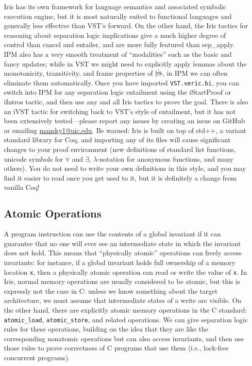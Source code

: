 \documentclass[11pt]{article}
\begin{document}
Iris has its own framework for language semantics and associated symbolic execution engine, but it is most naturally suited to functional languages and generally less effective than VST's \textsf{forward}. On the other hand, the Iris tactics for reasoning about separation logic implications give a much higher degree of control than \textsf{cancel} and \textsf{entailer}, and are more fully featured than \textsf{sep\_apply}. IPM also has a very smooth treatment of ``modalities'' such as the basic and fancy updates; while in VST we might need to explicitly apply lemmas about the monotonicity, transitivity, and frame properties of $\upd$, in IPM we can often eliminate them automatically. Once you have imported \texttt{VST.veric.bi}, you can switch into IPM for any separation logic entailment using the \textsf{iStartProof} or \textsf{iIntros} tactic, and then use any and all Iris tactics to prove the goal. There is also an \textsf{iVST} tactic for switching back to VST's style of entailment, but it has not been extensively tested---please report any issues by creating an issue on GitHub or emailing \url{mansky1@uic.edu}. Be warned: Iris is built on top of std++, a variant standard library for Coq, and importing any of its files will cause significant changes to your proof environment (new definitions of standard list functions, unicode symbols for $\forall$ and $\exists$, $\lambda$-notation for anonymous functions, and many others). You do not need to write your own definitions in this style, and you may find it easier to read once you get used to it, but it is definitely a change from vanilla Coq!

\subsection{Atomic Operations}
A program instruction can use the contents of a global invariant if it can guarantee that no one will ever see an intermediate state in which the invariant does not hold. This means that ``physically atomic'' operations can freely access invariants: for instance, if a global invariant holds full ownership of a memory location \texttt{x}, then a physically atomic operation can read or write the value of \texttt{x}. In Iris, normal memory operations are usually considered to be atomic, but this is expressly not the case in C: unless we know something about the target architecture, we must assume that intermediate states of a write are visible. On the other hand, there are explicitly atomic memory operations in the C standard: \texttt{atomic\_load}, \texttt{atomic\_store}, and related operations. We can give separation logic rules for these operations, building on the idea that they are like the corresponding nonatomic operations but can also access invariants, and then use those rules to prove correctness of C programs that use them (i.e., lock-free concurrent programs).
\end{document}

